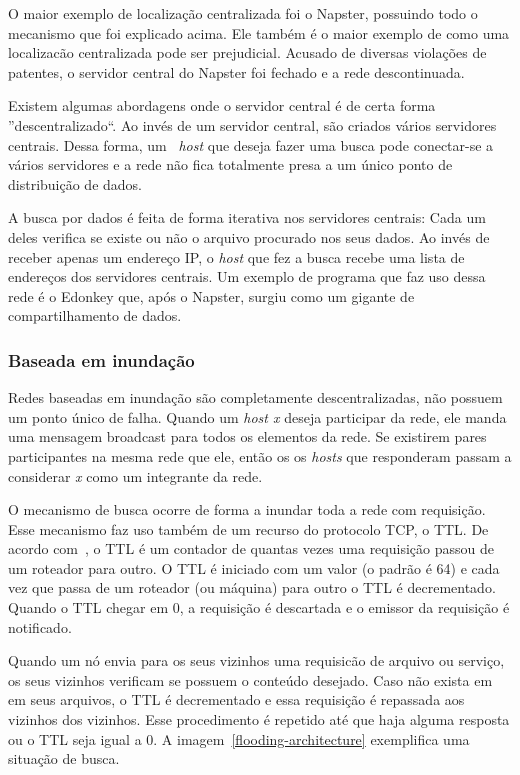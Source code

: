 O maior exemplo de localização centralizada foi o Napster, possuindo todo o mecanismo que foi explicado acima. Ele também é o maior exemplo de como uma localizacão centralizada pode ser prejudicial. Acusado de diversas violações de patentes, o servidor central do Napster foi fechado e a rede descontinuada.

Existem algumas abordagens onde o servidor central é de certa forma ''descentralizado``. Ao invés de um servidor central, são criados vários servidores centrais. Dessa forma, um ~\emph{host} que deseja fazer uma busca pode conectar-se a vários servidores e a rede não fica totalmente presa a um único ponto de distribuição de dados.

A busca por dados é feita de forma iterativa nos servidores centrais: Cada um deles verifica se existe ou não o arquivo procurado nos seus dados. Ao invés de receber apenas um endereço IP, o \emph{host} que fez a busca recebe uma lista de endereços dos servidores centrais.
Um exemplo de programa que faz uso dessa rede é o Edonkey que, após o Napster, surgiu como um gigante de compartilhamento de dados.

\subsubsection{Baseada em inundação}

Redes baseadas em inundação são completamente descentralizadas, não possuem um ponto único de falha. Quando um \emph{host x} deseja participar da rede, ele manda uma mensagem broadcast para todos os elementos da rede. Se existirem pares participantes na mesma rede que ele, então os os \emph{hosts} que responderam passam a considerar \emph{x} como um integrante da rede.

O mecanismo de busca ocorre de forma a inundar toda a rede com requisição. Esse mecanismo faz uso também de um recurso do protocolo TCP, o TTL. De acordo com~\cite{stevens93}, o TTL é um contador de quantas vezes uma requisição passou de um roteador para outro. O TTL é iniciado com um valor (o padrão é 64) e cada vez que passa de um roteador (ou máquina) para outro o TTL é decrementado. Quando o TTL chegar em 0, a requisição é descartada e o emissor da requisição é notificado.

Quando um nó envia para os seus vizinhos uma requisicão de arquivo ou serviço, os seus vizinhos verificam se possuem o conteúdo desejado. Caso não exista em em seus arquivos, o TTL é decrementado e essa requisição é repassada aos vizinhos dos vizinhos. Esse procedimento é repetido até que haja alguma resposta ou o TTL seja igual a 0. A imagem~\ref{flooding-architecture} exemplifica uma situação de busca.

